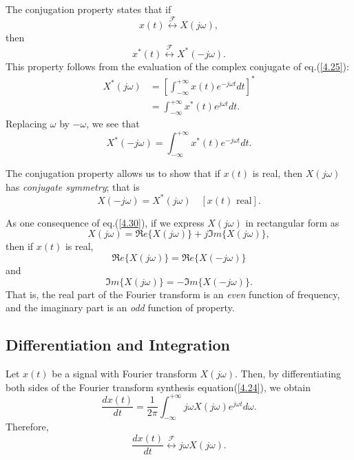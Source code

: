 \documentclass[a4paper,10pt,twoside]{book}
\begin{document}
The conjugation property states that if $$x(t)\overset{\mathcal{F}}{\longleftrightarrow}X(j\omega),$$ then
\begin{equation}
    \boxed{x^*(t)\overset{\mathcal{F}}{\longleftrightarrow}X^*(-j\omega).}
    \label{4.28}
\end{equation}
This property follows from the evaluation of the complex conjugate of eq.\;(\ref{4.25}):
\begin{equation*}
    \begin{aligned}X^{*}(j\omega)&=\left[\int_{-\infty}^{+\infty}x(t)e^{-j\omega t}dt\right]^{*}\\&=\int_{-\infty}^{+\infty}x^{*}(t)e^{j\omega t} dt.\end{aligned}
\end{equation*}
Replacing $\omega$ by $-\omega$, we see that
\begin{equation}
    X^*(-j\omega)=\int_{-\infty}^{+\infty}x^*(t)e^{-j\omega t}dt.
    \label{4.29}
\end{equation}

The conjugation property allows us to show that if $x(t)$ is real, then $X(j\omega)$ has \textit{conjugate symmetry}; that is
\begin{equation}
    \boxed{X(-j\omega)=X^*(j\omega)\quad[x(t)\text{ real}].}
    \label{4.30}
\end{equation}

As one consequence of eq.\;(\ref{4.30}), if we express $X(j\omega)$ in rectangular form as $$X(j\omega)=\Re e\{X(j\omega)\}+j\Im m\{X(j\omega)\},$$ then if $x(t)$ is real, $$\Re e\{X(j\omega)\}=\Re e\{X(-j\omega)\}$$ and $$\Im m\{X(j\omega)\}=-\Im m\{X(-j\omega)\}.$$ That is, the real part of the Fourier transform is an \textit{even} function of frequency, and the imaginary part is an \textit{odd} function of property.

\subsection{Differentiation and Integration}

Let $x(t)$ be a signal with Fourier transform $X(j\omega)$. Then, by differentiating both sides of the Fourier transform synthesis equation\;(\ref{4.24}), we obtain $$\frac{dx(t)}{dt}=\frac1{2\pi}\int_{-\infty}^{+\infty}j\omega X(j\omega)e^{j\omega t}d\omega.$$ Therefore,
\begin{equation}
    \boxed{\frac{dx(t)}{dt}\overset{\mathcal{F}}{\longleftrightarrow}j\omega X(j\omega).}
    \label{4.31}
\end{equation}
\end{document}

